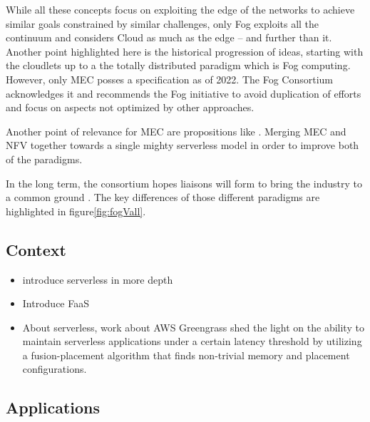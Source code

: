 \documentclass[11pt]{sdm}
\begin{document}
While all these concepts focus on exploiting the edge of the networks to achieve similar goals constrained by similar challenges, only Fog exploits all the continuum and considers Cloud as much as the edge -- and further than it. Another point highlighted here is the historical progression of ideas, starting with the cloudlets up to a the totally distributed paradigm which is Fog computing. However, only \gls{MEC} posses a specification as of 2022. The Fog Consortium acknowledges it and recommends the Fog initiative to avoid duplication of efforts and focus on aspects not optimized by other approaches. 

Another point of relevance for \gls{MEC} are propositions like . Merging \gls{MEC} and \gls{NFV} together towards a single mighty serverless model in order to improve both of the paradigms.

In the long term, the consortium hopes liaisons will form to bring the industry to a common ground \cite{ieee_standards_association_ieee_2018}. The key differences of those different paradigms are highlighted in figure\ref{fig:fogVall}.

\subsection {Context}
\begin{itemize}
	\item introduce serverless in more depth
	\item Introduce \gls{FaaS}
	\item About serverless,  work about AWS Greengrass shed the light on the ability to maintain serverless applications under a certain latency threshold by utilizing a fusion-placement algorithm that finds non-trivial memory and placement configurations.
\end{itemize}

\subsection {Applications}
\end{document}
